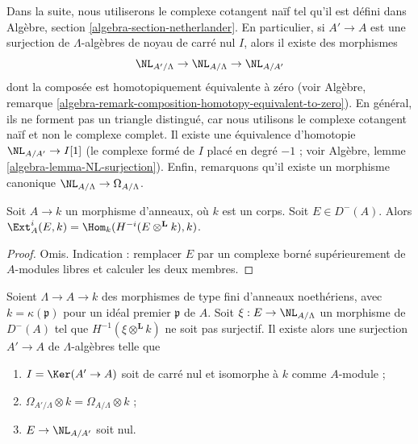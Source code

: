 \medskip\noindent
Dans la suite, nous utiliserons le complexe cotangent naïf tel qu'il est défini
dans Algèbre, section \ref{algebra-section-netherlander}. En particulier, si
$A' \to A$ est une surjection de $\Lambda$-algèbres de noyau de carré nul $I$,
alors il existe des morphismes
$$
\NL_{A'/\Lambda} \to \NL_{A/\Lambda} \to \NL_{A/A'}
$$
dont la composée est homotopiquement équivalente à zéro (voir Algèbre,
remarque \ref{algebra-remark-composition-homotopy-equivalent-to-zero}). En
général, ils ne forment pas un triangle distingué, car nous utilisons le
complexe cotangent naïf et non le complexe complet. Il existe une équivalence
d'homotopie $\NL_{A/A'} \to I[1]$ (le complexe formé de $I$ placé en degré
$-1$ ; voir Algèbre, lemme \ref{algebra-lemma-NL-surjection}). Enfin,
remarquons qu'il existe un morphisme canonique
$\NL_{A/\Lambda} \to \Omega_{A/\Lambda}$.

\begin{lemma}
\label{lemma-compute-ext-into-field}
Soit $A \to k$ un morphisme d'anneaux, où $k$ est un corps. Soit
$E \in D^-(A)$. Alors
$\Ext^i_A(E, k) = \Hom_k(H^{-i}(E \otimes^\mathbf{L} k), k)$.
\end{lemma}

\begin{proof}
Omis. Indication : remplacer $E$ par un complexe borné supérieurement de
$A$-modules libres et calculer les deux membres.
\end{proof}

\begin{lemma}
\label{lemma-construct-essential-surjection}
Soient $\Lambda \to A \to k$ des morphismes de type fini d'anneaux
noethériens, avec $k = \kappa(\mathfrak p)$ pour un idéal premier
$\mathfrak p$ de $A$. Soit $\xi : E \to \NL_{A/\Lambda}$ un morphisme de
$D^{-}(A)$ tel que $H^{-1}(\xi \otimes^{\mathbf{L}} k)$ ne soit pas surjectif.
Il existe alors une surjection $A' \to A$ de $\Lambda$-algèbres telle que
\begin{enumerate}
\item[(a)] $I = \Ker(A' \to A)$ soit de carré nul et isomorphe à $k$ comme
$A$-module ;
\item[(b)] $\Omega_{A'/\Lambda} \otimes k = \Omega_{A/\Lambda} \otimes k$ ;
\item[(c)] $E \to \NL_{A/A'}$ soit nul.
\end{enumerate}
\end{lemma}

